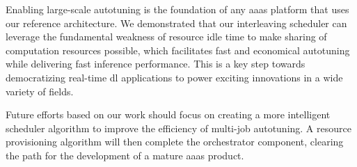 Enabling large-scale autotuning is the foundation of any \gls{aaas} platform that uses our reference architecture. We demonstrated that our interleaving scheduler can leverage the fundamental weakness of resource idle time to make sharing of computation resources possible, which facilitates fast and economical autotuning while delivering fast inference performance. This is a key step towards democratizing real-time \gls{dl} applications to power exciting innovations in a wide variety of fields.

Future efforts based on our work should focus on creating a more intelligent scheduler algorithm to improve the efficiency of multi-job autotuning. A resource provisioning algorithm will then complete the orchestrator component, clearing the path for the development of a mature \gls{aaas} product.
